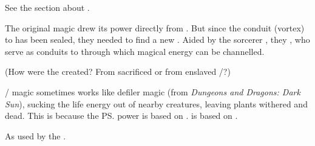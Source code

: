 \begin{gloss}
  
  
  
  
  \begin{comment}
    \paragraph{\Aryoth magic}
  \end{comment}
  See the section about . 
  
  
  
  
  
  
  
  
  
  \begin{comment}
    \paragraph{\Bane magic}
  \end{comment}
  The original \bane{} magic drew its power directly from \Erebos{}. But since the conduit (vortex) to \Erebos{} has been sealed, they needed to find a new . Aided by the \nephilic{} sorcerer \Semiza, they , who serve as conduits to \Erebos{} through which magical energy can be channelled. 
  
  (How were the \Qliphoth{} created? 
  From sacrificed \banelords{} or from enslaved \pdaemons{}/\mdaemons{}?)
  
  \Bane/\itzach{} magic sometimes works like defiler magic (from \emph{Dungeons and Dragons: Dark Sun}), sucking the life energy out of nearby creatures, leaving plants withered and dead. This is because the \ps{\banes}{} power is based on . is based on . 
  
  
  
  
  
  
  
  
  
  
  \begin{comment}
    \paragraph{Chaos magic}
  \end{comment}
    As used by the \dragons.
  

\end{gloss}
